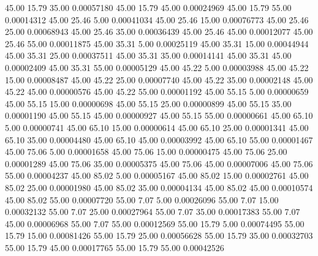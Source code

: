      45.00     15.79     35.00     0.00057180
     45.00     15.79     45.00     0.00024969
     45.00     15.79     55.00     0.00014312
     45.00     25.46      5.00     0.00041034
     45.00     25.46     15.00     0.00076773
     45.00     25.46     25.00     0.00068943
     45.00     25.46     35.00     0.00036439
     45.00     25.46     45.00     0.00012077
     45.00     25.46     55.00     0.00011875
     45.00     35.31      5.00     0.00025119
     45.00     35.31     15.00     0.00044944
     45.00     35.31     25.00     0.00037511
     45.00     35.31     35.00     0.00014141
     45.00     35.31     45.00     0.00002409
     45.00     35.31     55.00     0.00005129
     45.00     45.22      5.00     0.00003988
     45.00     45.22     15.00     0.00008487
     45.00     45.22     25.00     0.00007740
     45.00     45.22     35.00     0.00002148
     45.00     45.22     45.00     0.00000576
     45.00     45.22     55.00     0.00001192
     45.00     55.15      5.00     0.00000659
     45.00     55.15     15.00     0.00000698
     45.00     55.15     25.00     0.00000899
     45.00     55.15     35.00     0.00001190
     45.00     55.15     45.00     0.00000927
     45.00     55.15     55.00     0.00000661
     45.00     65.10      5.00     0.00000741
     45.00     65.10     15.00     0.00000614
     45.00     65.10     25.00     0.00001341
     45.00     65.10     35.00     0.00004480
     45.00     65.10     45.00     0.00003992
     45.00     65.10     55.00     0.00001467
     45.00     75.06      5.00     0.00001658
     45.00     75.06     15.00     0.00000475
     45.00     75.06     25.00     0.00001289
     45.00     75.06     35.00     0.00005375
     45.00     75.06     45.00     0.00007006
     45.00     75.06     55.00     0.00004237
     45.00     85.02      5.00     0.00005167
     45.00     85.02     15.00     0.00002761
     45.00     85.02     25.00     0.00001980
     45.00     85.02     35.00     0.00004134
     45.00     85.02     45.00     0.00010574
     45.00     85.02     55.00     0.00007720
     55.00      7.07      5.00     0.00026096
     55.00      7.07     15.00     0.00032132
     55.00      7.07     25.00     0.00027964
     55.00      7.07     35.00     0.00017383
     55.00      7.07     45.00     0.00006968
     55.00      7.07     55.00     0.00012569
     55.00     15.79      5.00     0.00074495
     55.00     15.79     15.00     0.00081426
     55.00     15.79     25.00     0.00056628
     55.00     15.79     35.00     0.00032703
     55.00     15.79     45.00     0.00017765
     55.00     15.79     55.00     0.00042526
